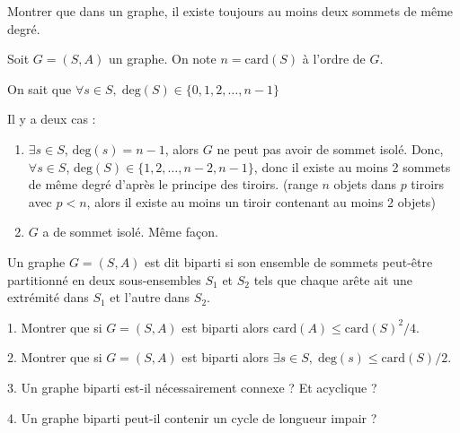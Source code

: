 \begin{question}{}{}
Montrer que dans un graphe, il existe toujours au moins deux sommets de même degré.
\end{question}

\begin{myproof}
Soit $G = (S,A)$ un graphe.
On note $n = \mathrm{car d}(S)$ à l'ordre de $G$.

On sait que  $\forall s \in S, \; \mathrm{deg} (S) \in \{0, 1, 2, \ldots, n-1\}$

Il y a deux cas :
\begin{enumerate}
    \item $\exists s \in S$, $\mathrm{deg} (s) = n-1$, alors $G$ ne peut pas avoir de sommet isolé.
        Donc, $\forall s\in S$, $\mathrm{deg} (S) \in \{1, 2,\ldots, n-2,n-1\}$, donc il existe au moins 2 sommets de même degré d'après le principe des tiroirs. (range $n$ objets dans $p$ tiroirs avec $p<n$, alors il existe au moins un tiroir contenant au moins 2 objets)
    \item $G$ a de sommet isolé. Même façon.
\end{enumerate}
\end{myproof}

\begin{question}{}{}
Un graphe $G = (S, A)$ est dit biparti si son ensemble de sommets peut-être partitionné en deux sous-ensembles $S_1$ et $S_2$ tels que chaque arête ait une extrémité dans $S_1$ et l’autre dans $S_2$.

1. Montrer que si $G = (S, A)$ est biparti alors $\mathrm{card} (A) \le  \mathrm{card}(S)^{2}/4$.

2. Montrer que si $G = (S, A)$ est biparti alors $\exists s \in S, \;\mathrm{ deg}(s) \le  \mathrm{card} (S)/2$. 

3. Un graphe biparti est-il nécessairement connexe ? Et acyclique ?

4. Un graphe biparti peut-il contenir un cycle de longueur impair ?
\end{question}

